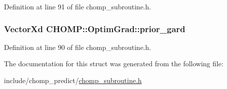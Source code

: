 Definition at line 91 of file chomp\+\_\+subroutine.\+h.

\subsubsection[{\texorpdfstring{prior\+\_\+gard}{prior_gard}}]{\setlength{\rightskip}{0pt plus 5cm}Vector\+Xd C\+H\+O\+M\+P\+::\+Optim\+Grad\+::prior\+\_\+gard}\hypertarget{struct_c_h_o_m_p_1_1_optim_grad_a0fc686f410e24fe733a474d2cf139714}{}\label{struct_c_h_o_m_p_1_1_optim_grad_a0fc686f410e24fe733a474d2cf139714}


Definition at line 90 of file chomp\+\_\+subroutine.\+h.



The documentation for this struct was generated from the following file\+:\begin{DoxyCompactItemize}
\item 
include/chomp\+\_\+predict/\hyperlink{chomp__subroutine_8h}{chomp\+\_\+subroutine.\+h}\end{DoxyCompactItemize}
